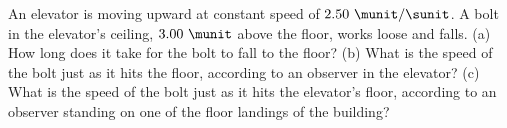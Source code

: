 %
An elevator is moving upward at constant speed of 
$2.50\ \munit/\sunit$. A bolt in the elevator's ceiling, $3.00\ \munit$ above the
floor, works loose and falls.
%
(a) How long does it take for the bolt to fall to the
floor?\answercheck\hwendpart
%
(b) What is the speed of the bolt just as it hits the floor,
according to an observer in the elevator?\answercheck\hwendpart
%
(c) What is the speed of the bolt just as it hits the elevator's floor,
according to an observer standing on one of the floor landings of the
building?\answercheck\hwendpart
%
